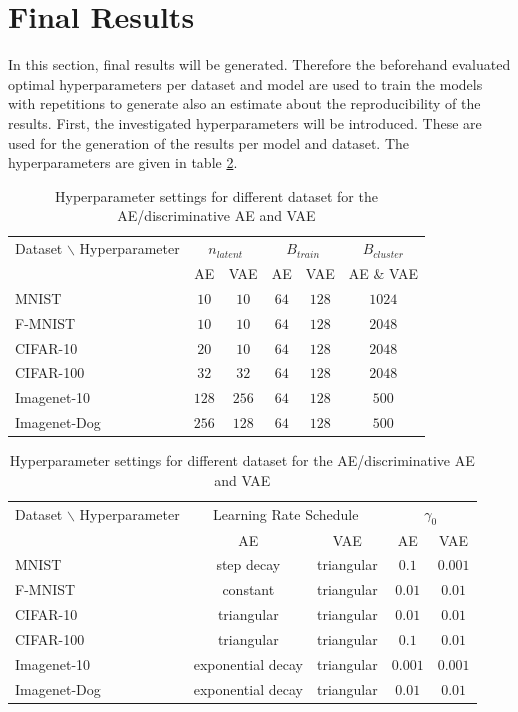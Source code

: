 \documentclass[12pt,DIV14,BCOR12mm,a4paper,footexclude,headinclude,halfparskip-,twoside,openright,cleardoubleempty,idxtotoc,bibtotoc,listtotoc]{scrreprt} %
\numberwithin{equation}{chapter}
\begin{document}
\section{Final Results}
In this section, final results will be generated. Therefore the beforehand evaluated optimal hyperparameters per dataset and model are used to train the models with repetitions to generate also an estimate about the reproducibility of the results. First, the investigated hyperparameters will be introduced. These are used for the generation of the results per model and dataset. The hyperparameters are given in table \ref{tab:Hyperparametersettings_AE_b_AE}.
	\begin{table}[htb!]
    		\caption{Hyperparameter settings for different dataset for the AE/discriminative AE and VAE}
    		\label{tab:Hyperparametersettings_AE_b_AE}
    		\begin{tabular}{l|ccccc}
    			\toprule
        		Dataset $\backslash$ Hyperparameter & \multicolumn{2}{c}{$n_{latent}$} & \multicolumn{2}{c}{$B_{train}$} & $B_{cluster}$\\
        		& AE & VAE & AE & VAE & AE \& VAE\\
        		\midrule
        		MNIST & $10$ & $10$ & $64$ & $128$ & $1024$\\
        		F-MNIST & $10$ & $10$ & $64$ & $128$ & $2048$\\
        		CIFAR-10 & $20$ & $10$ & $64$ & $128$ & $2048$\\
        		CIFAR-100 & $32$ & $32$ & $64$ & $128$ & $2048$\\
        		Imagenet-10 & $128$ & $256$ & $64$ & $128$ & $500$\\
        		Imagenet-Dog & $256$ & $128$ & $64$ & $128$ & $500$\\
        		\bottomrule
    		\end{tabular}
    		\begin{tabular}{l|cccc}
    			\toprule
        		Dataset $\backslash$ Hyperparameter & \multicolumn{2}{c}{Learning Rate Schedule} & \multicolumn{2}{c}{$\gamma_0$}\\
        		& AE & VAE & AE & VAE\\
        		\midrule
        		MNIST & step decay & triangular & $0.1$ & $0.001$\\
        		F-MNIST & constant & triangular & $0.01$ & $0.01$\\
        		CIFAR-10 & triangular & triangular & $0.01$ & $0.01$\\
        		CIFAR-100 & triangular & triangular & $0.1$ & $0.01$\\
        		Imagenet-10 & exponential decay & triangular & $0.001$ & $0.001$\\
        		Imagenet-Dog & exponential decay & triangular & $0.01$ & $0.01$\\
        		\bottomrule
    		\end{tabular}
	\end{table}
\end{document}
